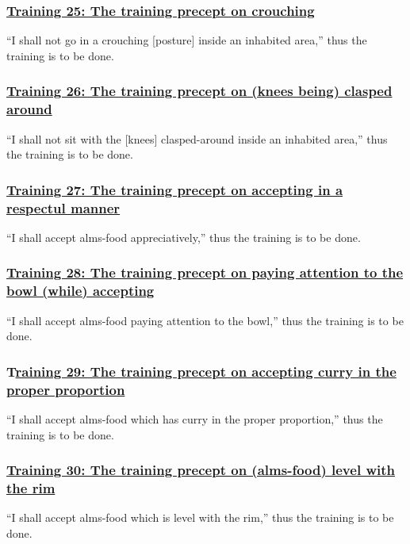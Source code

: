 \subsubsection*{\hyperref[sekh25]{Training 25: The training precept on crouching}}
\label{training25}
``I shall not go in a crouching [posture] inside an inhabited area,'' thus the training is to be done.

\subsubsection*{\hyperref[sekh26]{Training 26: The training precept on (knees being) clasped around}}
\label{training26}
``I shall not sit with the [knees] clasped-around inside an inhabited area,'' thus the training is to be done.

\subsubsection*{\hyperref[sekh27]{Training 27: The training precept on accepting in a respectul manner}}
\label{training27}
``I shall accept alms-food appreciatively,'' thus the training is to be done.

\subsubsection*{\hyperref[sekh28]{Training 28: The training precept on paying attention to the bowl (while) accepting}}
\label{training28}
``I shall accept alms-food paying attention to the bowl,'' thus the training is to be done.

\subsubsection*{T\hyperref[sekh29]{raining 29: The training precept on accepting curry in the proper proportion}}
\label{training29}
``I shall accept alms-food which has curry in the proper proportion,'' thus the training is to be done.

\subsubsection*{\hyperref[sekh30]{Training 30: The training precept on (alms-food) level with the rim}}
\label{training30}
``I shall accept alms-food which is level with the rim,'' thus the training is to be done.

